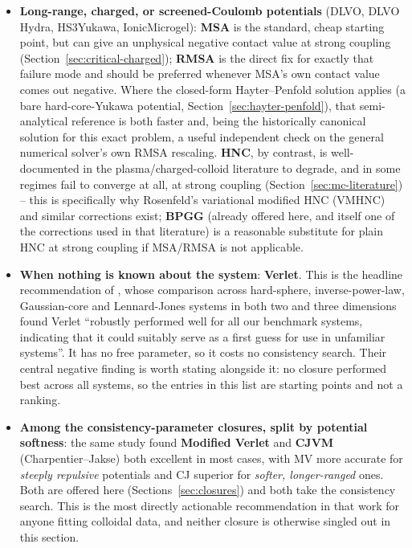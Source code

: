 \documentclass[11pt,a4paper]{article}
\begin{document}
\begin{itemize}[nosep]
    Section~\ref{sec:mc-literature}.
  \item \textbf{Long-range, charged, or screened-Coulomb potentials}
    (DLVO, DLVO Hydra, HS3Yukawa, IonicMicrogel): \textbf{MSA} is the
    standard, cheap starting point, but can give an unphysical negative
    contact value at strong coupling (Section~\ref{sec:critical-charged});
    \textbf{RMSA} is the direct fix for exactly that failure mode and should
    be preferred whenever MSA's own contact value comes out negative. Where
    the closed-form Hayter--Penfold solution applies (a bare hard-core-Yukawa
    potential, Section~\ref{sec:hayter-penfold}), that semi-analytical
    reference is both faster and, being the historically canonical solution
    for this exact problem, a useful independent check on the general
    numerical solver's own RMSA rescaling. \textbf{HNC}, by contrast, is
    well-documented in the plasma/charged-colloid literature to degrade, and
    in some regimes fail to converge at all, at strong coupling
    (Section~\ref{sec:mc-literature}) -- this is specifically why
    Rosenfeld's variational modified HNC (VMHNC) \cite{rosenfeld1986} and
    similar corrections exist; \textbf{BPGG} (already offered here, and
    itself one of the corrections used in that literature) is a reasonable
    substitute for plain HNC at strong coupling if MSA/RMSA is not
    applicable.
  \item \textbf{When nothing is known about the system}: \textbf{Verlet}.
    This is the headline recommendation of \cite{PihlajamaaJanssen2024}, whose
    comparison across hard-sphere, inverse-power-law, Gaussian-core and
    Lennard-Jones systems in both two and three dimensions found Verlet
    ``robustly performed well for all our benchmark systems, indicating that
    it could suitably serve as a first guess for use in unfamiliar
    systems''. It has no free parameter, so it costs no consistency search.
    Their central negative finding is worth stating alongside it: no closure
    performed best across all systems, so the entries in this list are
    starting points and not a ranking.
  \item \textbf{Among the consistency-parameter closures, split by potential
    softness}: the same study found \textbf{Modified Verlet} and
    \textbf{CJVM} (Charpentier--Jakse) both excellent in most cases, with MV
    more accurate for \emph{steeply repulsive} potentials and CJ superior
    for \emph{softer, longer-ranged} ones. Both are offered here
    (Sections~\ref{sec:closures}) and both take the consistency search. This
    is the most directly actionable recommendation in that work for anyone
    fitting colloidal data, and neither closure is otherwise singled out in
    this section.


\end{itemize}
\end{document}
